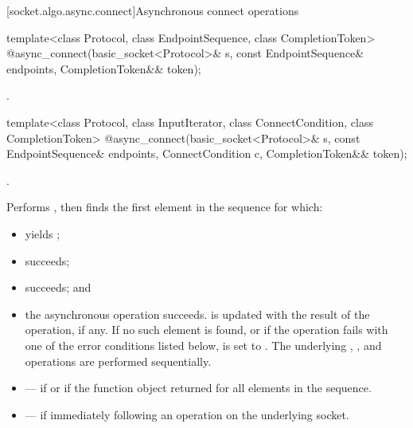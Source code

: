 [socket.algo.async.connect]{Asynchronous connect operations}

\begin{itemdecl}
template<class Protocol, class EndpointSequence, class CompletionToken>
  @\DEDUCED@ async_connect(basic_socket<Protocol>& s,
                        const EndpointSequence& endpoints,
                        CompletionToken&& token);
\end{itemdecl}

\begin{itemdescr}
\pnum
\returns {}.
\end{itemdescr}

\begin{itemdecl}
template<class Protocol, class InputIterator,
  class ConnectCondition, class CompletionToken>
    @\DEDUCED@ async_connect(basic_socket<Protocol>& s,
                          const EndpointSequence& endpoints,
                          ConnectCondition c,
                          CompletionToken&& token);
\end{itemdecl}

\begin{itemdescr}
\pnum
\completionsig {}.

\pnum
\effects Performs , then finds the first element  in the sequence  for which:
\begin{itemize}
\item
{} yields ;
\item
{} succeeds;
\item
{} succeeds; and
\item
 the asynchronous operation  succeeds.  is updated with the result of the  operation, if any. If no such element is found, or if the operation fails with one of the error conditions listed below,  is set to . \enternote The underlying , , and  operations are performed sequentially. \exitnote
\end{itemize}

\pnum
\errors
\begin{itemize}
\item
{} --- if  or if the function object  returned  for all elements in the sequence.
\item
{} --- if  immediately following an  operation on the underlying socket.
\end{itemize}
\end{itemdescr}

